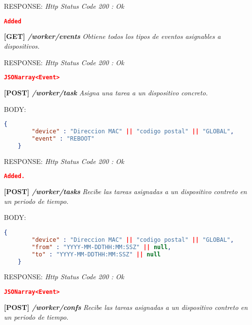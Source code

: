     RESPONSE: \newline
    \textit{Http Status Code 200 : Ok}
    \begin{lstlisting}[language=json,firstnumber=1]
    Added
    \end{lstlisting}
\hline \newline
\textbf{[GET] \textit{/worker/events }}
\textit{Obtiene todos los tipos de eventos asignables a dispositivos.}

    RESPONSE: \newline
    \textit{Http Status Code 200 : Ok}
    \begin{lstlisting}[language=json,firstnumber=1]
    JSONarray<Event>
    \end{lstlisting}
\hline \newline
\textbf{[POST] \textit{/worker/task }}
\textit{Asigna una tarea a un dispositivo concreto.}

    BODY:
   \begin{lstlisting}[language=json,firstnumber=1]
    {
        "device" : "Direccion MAC" || "codigo postal" || "GLOBAL",
        "event" : "REBOOT"
    }
    \end{lstlisting} 
    
    RESPONSE: \newline
    \textit{Http Status Code 200 : Ok}
    \begin{lstlisting}[language=json,firstnumber=1]
    Added.
    \end{lstlisting}
\hline \newline

\newpage
\textbf{[POST] \textit{/worker/tasks }}
\textit{Recibe las tareas asignadas a un dispositivo contreto en un periodo de tiempo.}

    BODY:
   \begin{lstlisting}[language=json,firstnumber=1]
    {
        "device" : "Direccion MAC" || "codigo postal" || "GLOBAL",
        "from" : "YYYY-MM-DDTHH:MM:SSZ" || null,
        "to" : "YYYY-MM-DDTHH:MM:SSZ" || null
    }
    \end{lstlisting} 
    
    RESPONSE: \newline
    \textit{Http Status Code 200 : Ok}
    \begin{lstlisting}[language=json,firstnumber=1]
    JSONarray<Event>
    \end{lstlisting}
\hline \newline

\textbf{[POST] \textit{/worker/confs }}
\textit{Recibe las tareas asignadas a un dispositivo contreto en un periodo de tiempo.}

